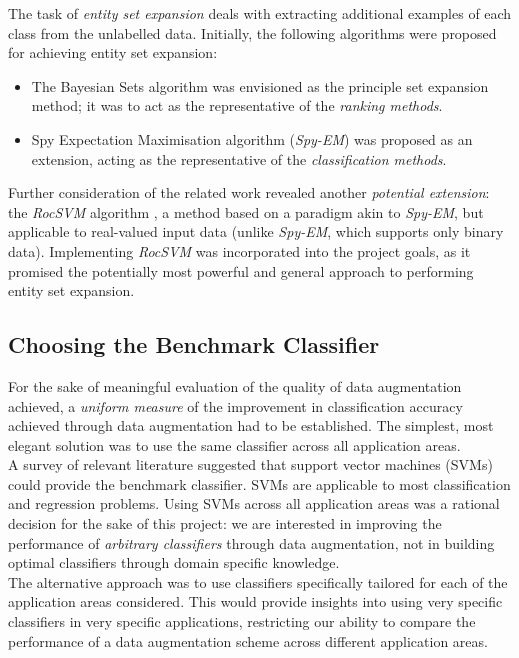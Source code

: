 \documentclass[12pt,twoside,notitlepage,amsart]{report} %
\begin{document}
	The task of \emph{entity set expansion} deals with extracting additional examples of each class from the unlabelled data. Initially, the following algorithms were proposed for achieving entity set expansion: 
	\begin{itemize}
	 \item The Bayesian Sets algorithm \cite{Ghahramani06} was envisioned as the principle set expansion method; it was to act as the representative of the \emph{ranking methods}.
	 \item Spy Expectation Maximisation algorithm (\emph{Spy-EM}\cite{Li10, Liu02}) was proposed as an extension, acting as the representative of the \emph{classification methods}. 
	\end{itemize}
	
	Further consideration of the related work revealed another \emph{potential extension}: the \emph{RocSVM} algorithm \cite{Li03}, a method based on a paradigm akin to \emph{Spy-EM}, but applicable to real-valued input data (unlike \emph{Spy-EM}, which supports only binary data). Implementing \emph{RocSVM} was incorporated into the project goals, as it promised the potentially most powerful \cite{Li03} and general approach to performing entity set expansion. 
	
	\subsection{Choosing the Benchmark Classifier}
	
	For the sake of meaningful evaluation of the quality of data augmentation achieved, a \emph{uniform measure} of the improvement in classification accuracy achieved through data augmentation had to be established. The simplest, most elegant solution was to use the same classifier across all application areas. \\
	
	A survey of relevant literature \cite{Bishop06} suggested that support vector machines ({SVMs}) could provide the benchmark classifier. {SVMs} are applicable to most classification and regression problems. Using {SVMs} across all application areas was a rational decision for the sake of this project: we are interested in improving the performance of \emph{arbitrary classifiers} through data augmentation, not in building optimal classifiers through domain specific knowledge. \\
	
	The alternative approach was to use classifiers specifically tailored for each of the application areas considered. This would provide insights into using very specific classifiers in very specific applications, restricting our ability to compare the performance of a data augmentation scheme across different application areas. \\
	
\end{document}
